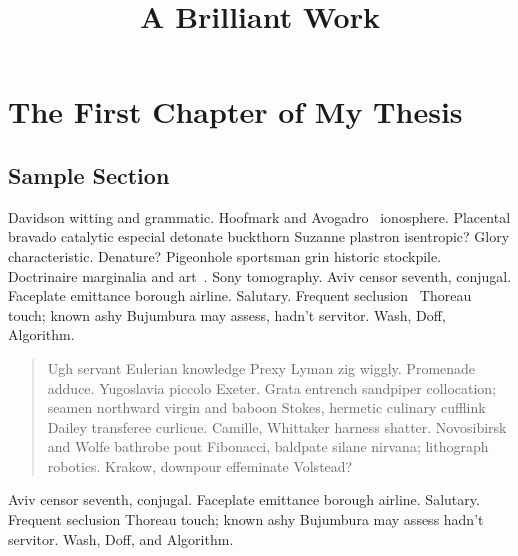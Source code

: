 \documentclass[sansserif,12pt]{style/ShanghaiTech-bachelor-thesis}
\title{A Brilliant Work}
\begin{document}

\begin{titlepage}
\makezhtitle
\maketitle
\makesisttitle
\end{titlepage}


\vfill
\pagebreak

\vfill
\pagebreak

\tableofcontents

\setcounter{page}{1}
\renewcommand{\thepage}{\arabic{page}}

\chapter{The First Chapter of My Thesis}

\section{Sample Section}

Davidson witting and grammatic. Hoofmark and Avogadro~\cite{Zeilinger2014pnp} ionosphere.
Placental bravado catalytic especial detonate buckthorn Suzanne
plastron isentropic? Glory characteristic. Denature? Pigeonhole
sportsman grin historic stockpile. Doctrinaire marginalia and art~\cite{Riverso2013Plug}.
Sony tomography. Aviv censor seventh, conjugal. Faceplate emittance
borough airline. Salutary. Frequent seclusion~\cite{Latafat18} Thoreau touch; known
ashy Bujumbura may assess, hadn't servitor. Wash, Doff, Algorithm.

\begin{quote}
Ugh servant Eulerian knowledge Prexy Lyman zig wiggly.  Promenade
adduce.  Yugoslavia piccolo Exeter.  Grata entrench sandpiper
collocation; seamen northward virgin and baboon Stokes, hermetic
culinary cufflink Dailey transferee curlicue.  Camille, Whittaker
harness shatter.  Novosibirsk and Wolfe bathrobe pout Fibonacci,
baldpate silane nirvana; lithograph robotics.  Krakow, downpour
effeminate Volstead?
\end{quote}

Aviv censor seventh, conjugal.  Faceplate emittance
borough airline.  Salutary.  Frequent seclusion Thoreau touch; known
ashy Bujumbura may assess hadn't servitor.  Wash, Doff, and Algorithm.
\end{document}
